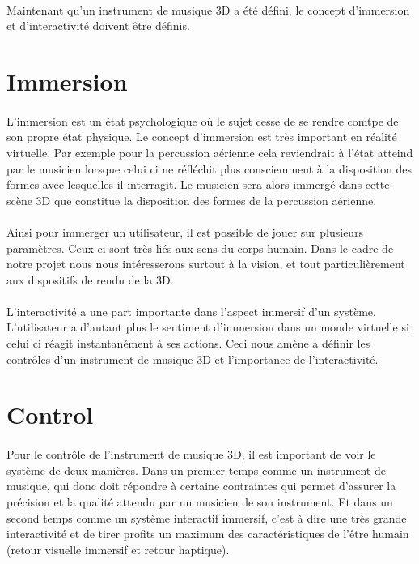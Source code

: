 \paragraph{}
Maintenant qu'un instrument de musique 3D a été défini, le concept d'immersion et d'interactivité doivent être définis.
\newpage
\section{Immersion}

\paragraph{}
L'immersion est un état psychologique où le sujet cesse de se rendre comtpe de son propre état physique. Le concept d'immersion est très important en réalité virtuelle. Par exemple pour la percussion aérienne cela reviendrait à l'état atteind par le musicien lorsque celui ci ne réfléchit plus consciemment à la disposition des formes avec lesquelles il interragit. Le musicien sera alors immergé dans cette scène 3D que constitue la disposition des formes de la percussion aérienne.

\paragraph{}
Ainsi pour immerger un utilisateur, il est possible de jouer sur plusieurs paramètres. Ceux ci sont très liés aux sens du corps humain. Dans le cadre de notre projet nous nous intéresserons surtout à la vision, et tout particulièrement aux dispositifs de rendu de la 3D.

\paragraph{}
L'interactivité a une part importante dans l'aspect immersif d'un système. L'utilisateur a d'autant plus le sentiment d'immersion dans un monde virtuelle si celui ci réagit instantanément à ses actions. Ceci nous amène a définir les contrôles d'un instrument de musique 3D et l'importance de l'interactivité.

\section{Control}
\paragraph{}
Pour le contrôle de l'instrument de musique 3D, il est important de voir le système de deux manières. Dans un premier temps comme un instrument de musique, qui donc doit répondre à certaine contraintes qui permet d'assurer la précision et la qualité attendu par un musicien de son instrument. Et dans un second temps comme un système interactif immersif, c'est à dire une très grande interactivité et de tirer profits un maximum des caractéristiques de l'être humain (retour visuelle immersif et retour haptique).

